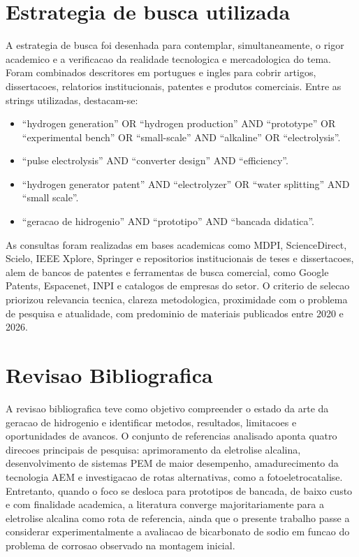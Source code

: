 \documentclass[12pt,oneside,a4paper,english,brazilian]{abntex2}
\begin{document}
\section{Estrategia de busca utilizada}

A estrategia de busca foi desenhada para contemplar, simultaneamente, o rigor academico e a verificacao da realidade tecnologica e mercadologica do tema. Foram combinados descritores em portugues e ingles para cobrir artigos, dissertacoes, relatorios institucionais, patentes e produtos comerciais. Entre as strings utilizadas, destacam-se:

\begin{itemize}
  \item ``hydrogen generation'' OR ``hydrogen production'' AND ``prototype'' OR ``experimental bench'' OR ``small-scale'' AND ``alkaline'' OR ``electrolysis''.
  \item ``pulse electrolysis'' AND ``converter design'' AND ``efficiency''.
  \item ``hydrogen generator patent'' AND ``electrolyzer'' OR ``water splitting'' AND ``small scale''.
  \item ``geracao de hidrogenio'' AND ``prototipo'' AND ``bancada didatica''.
\end{itemize}

As consultas foram realizadas em bases academicas como MDPI, ScienceDirect, Scielo, IEEE Xplore, Springer e repositorios institucionais de teses e dissertacoes, alem de bancos de patentes e ferramentas de busca comercial, como Google Patents, Espacenet, INPI e catalogos de empresas do setor. O criterio de selecao priorizou relevancia tecnica, clareza metodologica, proximidade com o problema de pesquisa e atualidade, com predominio de materiais publicados entre 2020 e 2026.

\section{Revisao Bibliografica}

A revisao bibliografica teve como objetivo compreender o estado da arte da geracao de hidrogenio e identificar metodos, resultados, limitacoes e oportunidades de avancos. O conjunto de referencias analisado aponta quatro direcoes principais de pesquisa: aprimoramento da eletrolise alcalina, desenvolvimento de sistemas PEM de maior desempenho, amadurecimento da tecnologia AEM e investigacao de rotas alternativas, como a fotoeletrocatalise. Entretanto, quando o foco se desloca para prototipos de bancada, de baixo custo e com finalidade academica, a literatura converge majoritariamente para a eletrolise alcalina como rota de referencia, ainda que o presente trabalho passe a considerar experimentalmente a avaliacao de bicarbonato de sodio em funcao do problema de corrosao observado na montagem inicial.
\end{document}
